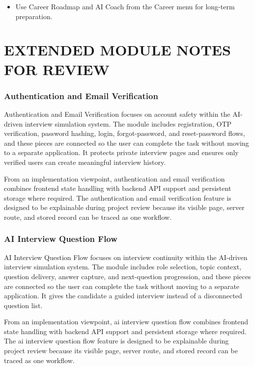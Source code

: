 \documentclass[12pt,a4paper]{report}
\begin{document}
\begin{itemize}
\item Use Career Roadmap and AI Coach from the Career menu for long-term preparation.
\end{itemize}

\chapter*{EXTENDED MODULE NOTES FOR REVIEW}

\subsection{Authentication and Email Verification}

Authentication and Email Verification focuses on account safety within the AI-driven interview simulation system. The module includes registration, OTP verification, password hashing, login, forgot-password, and reset-password flows, and these pieces are connected so the user can complete the task without moving to a separate application. It protects private interview pages and ensures only verified users can create meaningful interview history.

From an implementation viewpoint, authentication and email verification combines frontend state handling with backend API support and persistent storage where required. The authentication and email verification feature is designed to be explainable during project review because its visible page, server route, and stored record can be traced as one workflow.

\subsection{AI Interview Question Flow}

AI Interview Question Flow focuses on interview continuity within the AI-driven interview simulation system. The module includes role selection, topic context, question delivery, answer capture, and next-question progression, and these pieces are connected so the user can complete the task without moving to a separate application. It gives the candidate a guided interview instead of a disconnected question list.

From an implementation viewpoint, ai interview question flow combines frontend state handling with backend API support and persistent storage where required. The ai interview question flow feature is designed to be explainable during project review because its visible page, server route, and stored record can be traced as one workflow.
\end{document}
